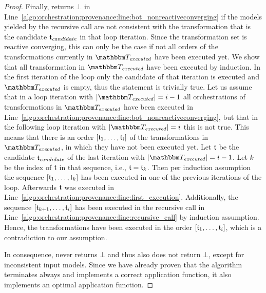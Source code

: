 \begin{proof}
    Finally,  returns $\bot$ in Line~\ref{algo:orchestration:provenance:line:bot_nonreactiveconverging} if the models yielded by the recursive call are not consistent with the transformation that is the candidate $\mathfrak{t}_{\mathit{candidate}}$ in that loop iteration.
    Since the transformation set is reactive converging, this can only be the case if not all orders of the transformations currently in $\provalgexecuted$ have been executed yet.
    We show that all transformation in $\provalgexecuted$ have been executed by induction.
    In the first iteration of the loop only the candidate of that iteration is executed and $\provalgexecuted$ is empty, thus the statement is trivially true.
    Let us assume that in a loop iteration with $\abs{\provalgexecuted} = i-1$ all orchestrations of transformations in $\provalgexecuted$ have been executed in Line~\ref{algo:orchestration:provenance:line:bot_nonreactiveconverging}, but that in the following loop iteration with $\abs{\provalgexecuted} = i$ this is not true.
    This means that there is an order $[\mathfrak{t}_{1}, \dots, \mathfrak{t}_{i}]$ of the transformations in $\provalgexecuted$, in which they have not been executed yet.
    Let $\mathfrak{t}$ be the candidate $\mathfrak{t}_{\mathit{candidate}}$ of the last iteration with $\abs{\provalgexecuted} = i-1$. Let $k$ be the index of $\mathfrak{t}$ in that sequence, i.e., $\mathfrak{t} = \mathfrak{t}_{k}$. Then per induction assumption the sequence $[\mathfrak{t}_{1}, \dots, \mathfrak{t}_{k}]$ has been executed in one of the previous iterations of the loop. 
    Afterwards $\mathfrak{t}$ was executed in Line~\ref{algo:orchestration:provenance:line:first_execution}.
    Additionally, the sequence $[\mathfrak{t}_{k+1}, \dots, \mathfrak{t}_{i}]$ has been executed in the recursive call in Line~\ref{algo:orchestration:provenance:line:recursive_call} by induction assumption.
    Hence, the transformations have been executed in the order $[\mathfrak{t}_{1}, \dots, \mathfrak{t}_{i}]$, which is a contradiction to our assumption.

    In consequence,  never returns $\bot$ and thus also  does not return $\bot$, except for inconsistent input models. Since we have already proven that the algorithm terminates always and implements a correct application function, it also implements an optimal application function.
\end{proof}

